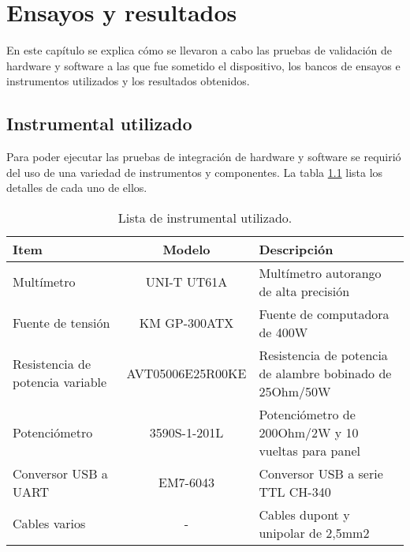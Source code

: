 
\chapter{Ensayos y resultados} %

\label{Chapter4} %


En este capítulo se explica cómo se llevaron a cabo las pruebas de validación de hardware y software a las que fue sometido el dispositivo, los bancos de ensayos e instrumentos utilizados y los resultados obtenidos.

\section{Instrumental utilizado}

Para poder ejecutar las pruebas de integración de hardware y software se requirió del uso de una variedad de instrumentos y componentes. La tabla \ref{tab:instrumentos} lista los detalles de cada uno de ellos.

\begin{table}[H]
	\centering
	\caption{Lista de instrumental utilizado.}
	\begin{tabular}{p{3cm} c p{6cm}}
		\toprule
		\textbf{Item} & \textbf{Modelo} & \textbf{Descripción} \\
		\midrule
		Multímetro			& UNI-T UT61A		& Multímetro autorango de alta precisión \\
		Fuente de tensión	& KM GP-300ATX		& Fuente de computadora de 400W \\
		Resistencia de potencia variable		& AVT05006E25R00KE	& Resistencia de potencia de alambre bobinado de 25Ohm/50W \\
		Potenciómetro							& 3590S-1-201L & Potenciómetro de 200Ohm/2W y 10 vueltas para panel \\
		Conversor USB a UART					& EM7-6043		& Conversor USB a serie TTL CH-340 \\
		Cables varios							& - 			& Cables dupont y unipolar de 2,5mm2 \\
		\bottomrule
		\hline
	\end{tabular}
	\label{tab:instrumentos}
\end{table}

